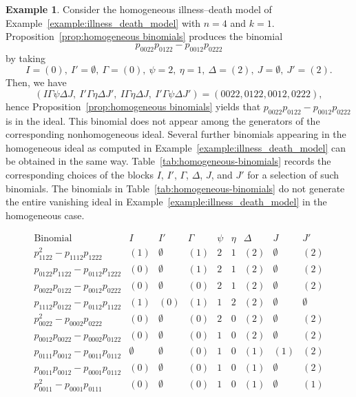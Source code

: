 \documentclass[11pt, a4paper]{article}
\numberwithin{equation}{section}
\theoremstyle{plain}
\theoremstyle{definition}
\newtheorem{example}{Example}
\begin{document}
\begin{example}
Consider the homogeneous illness--death model of Example~\ref{example:illness_death_model} with $n=4$ and $k=1$. Proposition~\ref{prop:homogeneous binomials} produces the binomial
\[
p_{0022} p_{0122} - p_{0012} p_{0222}
\]
by taking
\[
I=(0),\ I'=\emptyset,\ \Gamma=(0),\ \psi=2,\ \eta=1,\ \Delta=(2),\ J=\emptyset,\ J'=(2).
\]
Then, we have
\[
( I\Gamma\psi\Delta J,\ I'\Gamma\eta\Delta J',\
I\Gamma\eta\Delta J,\ I'\Gamma\psi\Delta J')
=(0022,0122,0012,0222),
\]
hence Proposition~\ref{prop:homogeneous binomials} yields that $p_{0022}p_{0122}-p_{0012}p_{0222}$ is in the ideal. This binomial does not appear among the generators of the corresponding nonhomogeneous ideal. Several further binomials appearing in the homogeneous ideal as computed in Example~\ref{example:illness_death_model} can be obtained in the same way. Table~\ref{tab:homogeneous-binomials} records the corresponding choices of the blocks $I$, $I'$, $\Gamma$, $\Delta$, $J$, and $J'$ for a selection of such binomials. The binomials in Table~\ref{tab:homogeneous-binomials} do not generate the entire vanishing ideal in Example~\ref{example:illness_death_model} in the homogeneous case. 
\begin{table}
\centering
\[
\begin{array}{c|c|c|c|c|c|c|c|c}
\text{Binomial} & I & I' & \Gamma & \psi & \eta & \Delta & J & J'\\
\hline
p_{1122}^2-p_{1112}p_{1222}
& (1) & \emptyset & (1) & 2 & 1 & (2) & \emptyset & (2)\\[1mm]
p_{0122}p_{1122}-p_{0112}p_{1222}
& (0) & \emptyset & (1) & 2 & 1 & (2) & \emptyset & (2)\\[1mm]
p_{0022}p_{0122}-p_{0012}p_{0222}
& (0) & \emptyset & (0) & 2 & 1 & (2) & \emptyset & (2)\\[1mm]
p_{1112}p_{0122}-p_{0112}p_{1122}
& (1) & (0) & (1) & 1 & 2 & (2) & \emptyset & \emptyset\\[1mm]
p_{0022}^2-p_{0002}p_{0222}
& (0) & \emptyset & (0) & 2 & 0 & (2) & \emptyset & (2)\\[1mm]
p_{0012}p_{0022}-p_{0002}p_{0122}
& (0) & \emptyset & (0) & 1 & 0 & (2) & \emptyset & (2)\\[1mm]
p_{0111}p_{0012}-p_{0011}p_{0112}
& \emptyset & \emptyset & (0) & 1 & 0 & (1) & (1) & (2)\\[1mm]
p_{0011}p_{0012}-p_{0001}p_{0112}
& (0) & \emptyset & (0) & 1 & 0 & (1) & \emptyset & (2)\\[1mm]
p_{0011}^2-p_{0001}p_{0111}
& (0) & \emptyset & (0) & 1 & 0 & (1) & \emptyset & (1)
\end{array}
\]
\caption{Examples of generators of the homogeneous ideal written in the notation of Proposition~\ref{prop:homogeneous binomials}.}
\label{tab:homogeneous-binomials}
\end{table}
\end{example}
\end{document}
